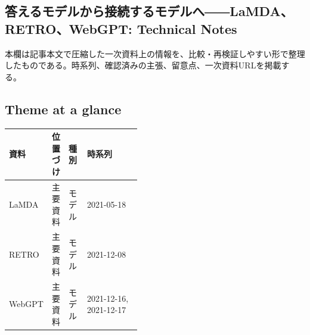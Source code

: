 \subsection*{答えるモデルから接続するモデルへ――LaMDA、RETRO、WebGPT: Technical Notes}
本欄は記事本文で圧縮した一次資料上の情報を、比較・再検証しやすい形で整理したものである。時系列、確認済みの主張、留意点、一次資料URLを掲載する。
\smallskip
{}\par
\medskip
\subsection*{Theme at a glance}
\begin{center}
\footnotesize
\begin{tabularx}{\linewidth}{@{}p{0.20\linewidth}p{0.10\linewidth}p{0.14\linewidth}X@{}}
\toprule
資料 & 位置づけ & 種別 & 時系列 \\
\midrule
LaMDA & 主要資料 & モデル & 2021-05-18 \\
RETRO & 主要資料 & モデル & 2021-12-08 \\
WebGPT & 主要資料 & モデル & 2021-12-16, 2021-12-17 \\
\bottomrule
\end{tabularx}
\end{center}
\normalsize

